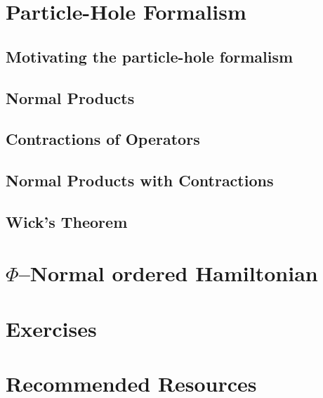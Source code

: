 \documentclass{article}
\begin{document}
\section{Particle-Hole Formalism}
\subsection{Motivating the particle-hole formalism}
\subsection{Normal Products}
\subsection{Contractions of Operators}
\subsection{Normal Products with Contractions}
\subsection{Wick's Theorem}
\section{$\Phi$--Normal ordered Hamiltonian}

\begin{comment}
Types of problems:
1. Slater's rules
2. 


Types of ways to solve:
1. First quantization
2. 2nd quantization in the true vacuum without Wick's theorem
3. 2nd quantization in the true vacuum with Wick's theorem
4. PH formalism with Wick's theorem 
5. PH formalism with Wick's theorem and $\Phi$-normal ordered Hamiltonian

\end{comment}

\section{Exercises}

\section{Recommended Resources}
\end{document}
